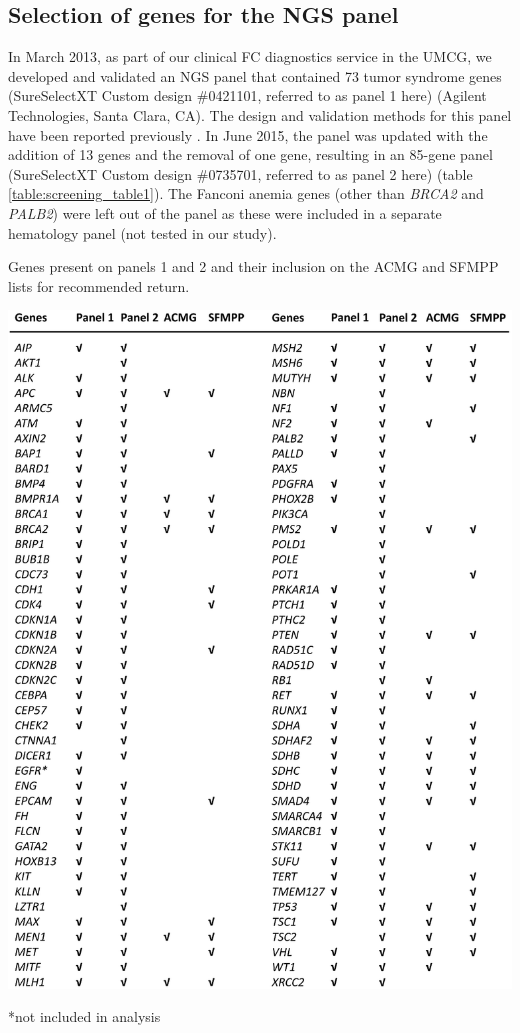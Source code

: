 \subsection{Selection of genes for the NGS panel}
In March 2013, as part of our clinical FC diagnostics service in the UMCG, we developed and validated an NGS panel that contained 73 tumor syndrome genes (SureSelectXT Custom design \#0421101, referred to as panel 1 here) (Agilent Technologies, Santa Clara, CA). 
The design and validation methods for this panel have been reported previously \cite{Sikkema_Raddatz_2013}. 
In June 2015, the panel was updated with the addition of 13 genes and the removal of one gene, resulting in an 85-gene panel (SureSelectXT Custom design \#0735701, referred to as panel 2 here) (table \ref{table:screening_table1}).
The Fanconi anemia genes (other than \textsl{BRCA2} and \textsl{PALB2}) were left out of the panel as these were included in a separate hematology panel (not tested in our study). 

\begin{table}
\caption[Panel 1 and 2 genes and ACMG and SFMPP inclusion]{Genes present on panels 1 and 2 and their inclusion on the ACMG and SFMPP lists for recommended return.}
\includegraphics[width=1.0\linewidth]{img/opportunistic_screening_Table1}
 \caption*{\footnotesize{*not included in analysis}}
\label{table:screening_table1}
\end{table}

